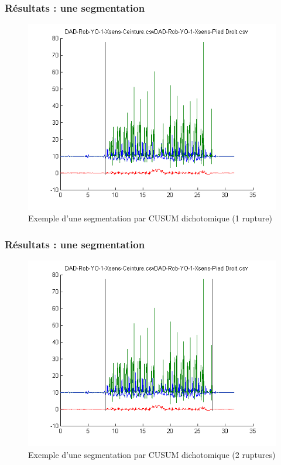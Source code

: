 \documentclass{beamer}
\begin{document}
\begin{frame}
	\frametitle{Résultats : une segmentation}
	\begin{figure}
		\includegraphics[scale=0.5]{dikt-seg1.png}
		\caption{Exemple d'une segmentation par CUSUM dichotomique (1 rupture)}
	\end{figure}
\end{frame}

\begin{frame}
	\frametitle{Résultats : une segmentation}
	\begin{figure}
		\includegraphics[scale=0.5]{dikt-seg2.png}
		\caption{Exemple d'une segmentation par CUSUM dichotomique (2 ruptures)}
	\end{figure}
\end{frame}
\end{document}
